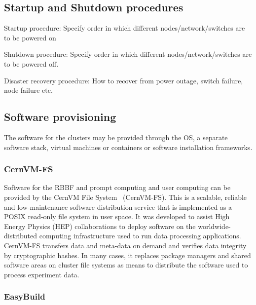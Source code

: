 \documentclass[12pt,a4paper]{article}
\begin{document}
\subsection{Startup and Shutdown procedures} \label{ssec:power}

Startup procedure: Specify order in which different nodes/network/switches are to be powered on

Shutdown procedure:  Specify order in which different nodes/network/switches are to be powered off.

Disaster recovery procedure: How to recover from power outage, switch failure, node failure etc. 

\subsection{Software provisioning} \label{ssec:software}

The software for the clusters may be provided through the OS, a separate software stack, virtual machines or containers or software installation frameworks.

\subsubsection{CernVM-FS} \label{ssec:cernvmfs}
Software for the RBBF and prompt computing and user computing can be provided by the CernVM File System~\cite{cernvmfs} (CernVM-FS). 
This is a scalable, reliable and low-maintenance software distribution service that is implemented as a POSIX read-only file system in user space. 
It was developed to assist High Energy Physics (HEP) collaborations to deploy software on the worldwide-distributed computing infrastructure used to run data processing applications. 
CernVM-FS transfers data and meta-data on demand and verifies data integrity by cryptographic hashes.
In many cases, it replaces package managers and shared software areas on cluster file systems as means to distribute the software used to process experiment data. 

\subsubsection{EasyBuild} \label{ssec:easybuild}
\end{document}

